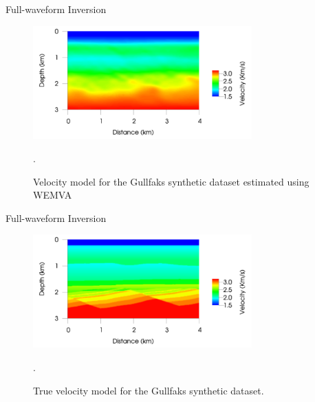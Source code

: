 \documentclass[xcolor=dvipsnames,notes]{beamer}
\begin{document}
%
\begin{frame}{Full-waveform Inversion}
\begin{figure}
\includegraphics[width=0.75\textwidth]{Fig/si-fig-510.pdf}
\caption{Velocity model for the Gullfaks synthetic dataset estimated using WEMVA}.
\label{fig:si-fig-305}
\end{figure}
%
\end{frame}
%
\begin{frame}{Full-waveform Inversion}
\begin{figure}
\includegraphics[width=0.75\textwidth]{Fig/si-fig-400.pdf}
\caption{True velocity model for the Gullfaks synthetic dataset.}.
\label{fig:si-fig-400}
\end{figure}
%
\end{frame}
%
\end{document}
